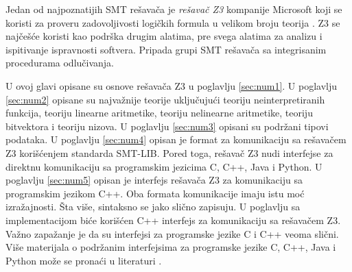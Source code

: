 \documentclass[12pt,oneside]{memoir}
\begin{document}
Jedan od najpoznatijih SMT rešavača je \emph{rešavač Z3} kompanije Microsoft koji se koristi za proveru zadovoljivosti logičkih formula u velikom broju teorija \cite{EfficientSMTSolver}. Z3 se najčešće koristi kao podrška drugim alatima, pre svega alatima za analizu i ispitivanje ispravnosti softvera. Pripada grupi SMT rešavača sa integrisanim procedurama odlučivanja.
\par
U ovoj glavi opisane su osnove rešavača Z3 u poglavlju \ref{sec:num1}. U poglavlju \ref{sec:num2} opisane su najvažnije teorije uključujući teoriju neinterpretiranih funkcija, teoriju linearne aritmetike, teoriju nelinearne aritmetike, teoriju bitvektora i teoriju nizova. U poglavlju \ref{sec:num3} opisani su  podržani tipovi podataka. U poglavlju \ref{sec:num4} opisan je format za komunikaciju sa rešavačem Z3 korišćenjem standarda SMT-LIB. Pored toga, rešavač Z3 nudi interfejse za direktnu komunikaciju sa programskim jezicima C, C++, Java i Python. U poglavlju \ref{sec:num5} opisan je interfejs rešavača Z3 za komunikaciju sa programskim jezikom C++. Oba formata komunikacije imaju istu moć izražajnosti. Šta više, sintaksno se jako slično zapisuju. U poglavlju sa implementacijom biće korišćen C++ interfejs za komunikaciju sa rešavačem Z3. Važno zapažanje je da su interfejsi za programske jezike C i C++ veoma slični. Više materijala o podržanim interfejsima za programske jezike C, C++, Java i Python može se pronaći u literaturi \cite{api}.
\end{document}

